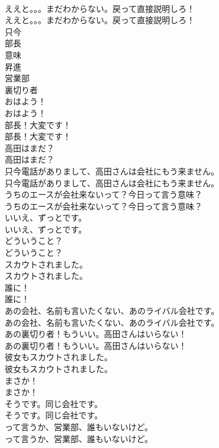 \documentclass[8pt]{extreport}
\begin{document}
\begin{CJK}{UTF8}{min}
\\	ええと。。。まだわからない。戻って直接説明しろ！	
\\	ええと。。。まだわからない。戻って直接説明しろ！ 
\\	只今
\\	部長
\\	意味
\\	昇進
\\	営業部
\\	裏切り者
\\	おはよう！	
\\	おはよう！ 
\\	部長！大変です！	
\\	部長！大変です！ 
\\	高田はまだ？	
\\	高田はまだ？ 
\\	只今電話がありまして、高田さんは会社にもう来ません。	
\\	只今電話がありまして、高田さんは会社にもう来ません。 
\\	うちのエースが会社来ないって？今日って言う意味？	
\\	うちのエースが会社来ないって？今日って言う意味？ 
\\	いいえ、ずっとです。	
\\	いいえ、ずっとです。 
\\	どういうこと？	
\\	どういうこと？ 
\\	スカウトされました。	
\\	スカウトされました。 
\\	誰に！	
\\	誰に！ 
\\	あの会社、名前も言いたくない、あのライバル会社です。	
\\	あの会社、名前も言いたくない、あのライバル会社です。 
\\	あの裏切り者！もういい。高田さんはいらない！	
\\	あの裏切り者！もういい。高田さんはいらない！ 
\\	彼女もスカウトされました。	
\\	彼女もスカウトされました。 
\\	まさか！	
\\	まさか！ 
\\	そうです。同じ会社です。	
\\	そうです。同じ会社です。 
\\	って言うか、営業部、誰もいないけど。	
\\	って言うか、営業部、誰もいないけど。 

\end{CJK}
\end{document}
